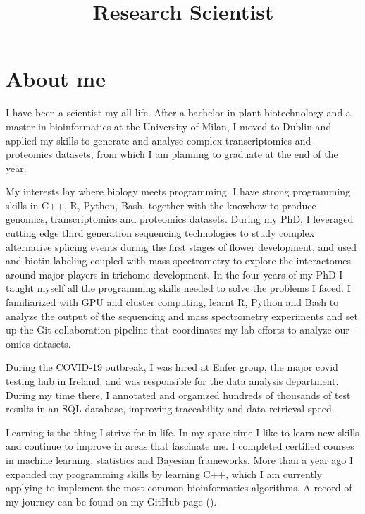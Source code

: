 \documentclass{moderncv}
\title{Research Scientist}
\begin{document}
\maketitle
\section{About me}
I have been a scientist my all life. After a bachelor in plant biotechnology
and a master in bioinformatics at the University of Milan, I moved to Dublin
and applied my skills to generate and analyse complex transcriptomics and
proteomics datasets, from which I am planning to graduate at the end of the
year.

My interests lay where biology meets programming. I have strong programming
skills in C++, R, Python, Bash, together with the knowhow to produce genomics,
transcriptomics and proteomics datasets. During my PhD, I leveraged cutting
edge third generation sequencing technologies to study complex alternative
splicing events during the first stages of flower development, and used and
biotin labeling coupled with mass spectrometry to explore the interactomes
around major players in trichome development. In the four years of my PhD I
taught myself all the programming skills needed to solve the problems I faced.
I familiarized with GPU and cluster computing, learnt R, Python and Bash to
analyze the output of the sequencing and mass spectrometry experiments and set
up the Git collaboration pipeline that coordinates my lab efforts to analyze
our -omics datasets.

During the COVID-19 outbreak, I was hired at Enfer group, the major covid
testing hub in Ireland, and was responsible for the data analysis department.
During my time there, I annotated and organized hundreds of thousands of test
results in an SQL database, improving traceability and data retrieval speed.

Learning is the thing I strive for in life. In my spare time I like to learn
new skills and continue to improve in areas that fascinate me. I completed
certified courses in machine learning, statistics and Bayesian frameworks.
More than a year ago I expanded my programming skills by learning C++, which I
am currently applying to implement the most common bioinformatics algorithms.
A record of my journey can be found on my GitHub page
().
\end{document}
